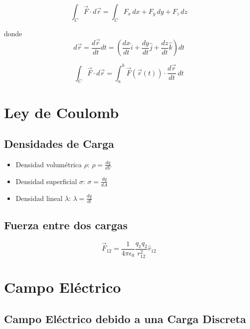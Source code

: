 \documentclass[12pt,a4paper,twocolumn]{article}
\begin{document}
\begin{equation*}
    \int_C \vec{F} \cdot d\vec{r} = \int_C F_x \, dx + F_y \, dy + F_z \, dz
\end{equation*}

donde
\begin{equation*}
    d\vec{r} = \frac{d\vec{r}}{dt} dt = \left( \frac{dx}{dt} \hat{i} + \frac{dy}{dt} \hat{j} + \frac{dz}{dt} \hat{k} \right) dt
\end{equation*}

\begin{equation*}
    \int_C \vec{F} \cdot d\vec{r} = \int_a^b \vec{F}(\vec{r}(t)) \cdot \frac{d\vec{r}}{dt} \, dt
\end{equation*}

\section*{Ley de Coulomb}

\subsection*{Densidades de Carga}

\begin{itemize}
    \item Densidad volumétrica $\rho$: $\rho = \frac{dq}{dV}$
    \item Densidad superficial $\sigma$: $\sigma = \frac{dq}{dA}$
    \item Densidad lineal $\lambda$: $\lambda = \frac{dq}{dl}$
\end{itemize}

\subsection*{Fuerza entre dos cargas}

\begin{equation*}
    \vec{F}_{12} = \frac{1}{4\pi \epsilon_0} \frac{q_1 q_2}{r_{12}^2} \hat{r}_{12}
\end{equation*}

\section*{Campo Eléctrico}

\subsection*{Campo Eléctrico debido a una Carga Discreta}
\end{document}
